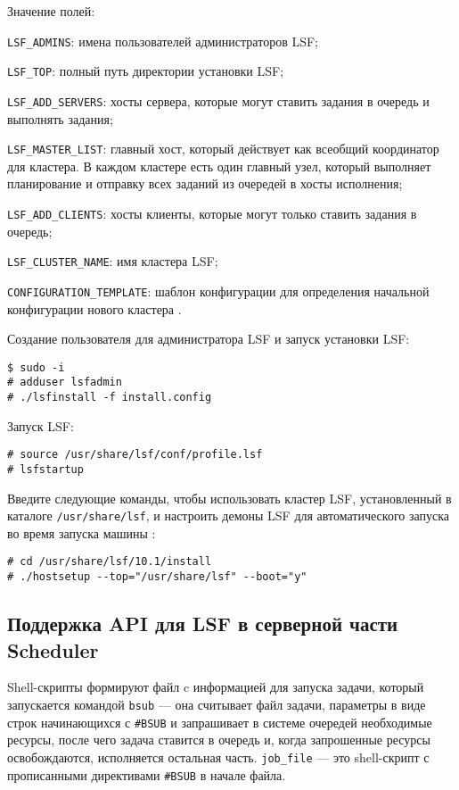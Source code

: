 Значение полей:

\lstinline{LSF_ADMINS}: имена пользователей администраторов LSF;

\lstinline{LSF_TOP}: полный путь директории установки LSF;

\lstinline{LSF_ADD_SERVERS}: хосты сервера, которые могут ставить задания в очередь и выполнять задания;

\lstinline{LSF_MASTER_LIST}: главный хост, который действует как всеобщий координатор для кластера. В каждом кластере есть один главный узел, который выполняет планирование и отправку всех заданий из очередей в хосты исполнения;

\lstinline{LSF_ADD_CLIENTS}: хосты клиенты, которые могут только ставить задания в очередь;

\lstinline{LSF_CLUSTER_NAME}: имя кластера LSF;

\lstinline{CONFIGURATION_TEMPLATE}: шаблон конфигурации для определения начальной конфигурации нового кластера \cite{lsf_overview, hosts_about}.

Создание пользователя для администратора LSF и запуск установки LSF:

\begin{lstlisting}
$ sudo -i
# adduser lsfadmin
# ./lsfinstall -f install.config
\end{lstlisting}

Запуск LSF:

\begin{lstlisting}
# source /usr/share/lsf/conf/profile.lsf
# lsfstartup
\end{lstlisting}

Введите следующие команды, чтобы использовать кластер LSF, установленный в каталоге \lstinline{/usr/share/lsf}, и настроить демоны LSF для автоматического запуска во время запуска машины \cite{configuring-cluster}:

\begin{lstlisting}
# cd /usr/share/lsf/10.1/install
# ./hostsetup --top="/usr/share/lsf" --boot="y"
\end{lstlisting}


\subsection{Поддержка API для LSF в серверной части Scheduler}

Shell-скрипты формируют файл c информацией для запуска задачи, который запускается командой \lstinline{bsub} --- она считывает файл задачи, параметры в виде строк начинающихся с \lstinline{#BSUB} и запрашивает в системе очередей необходимые ресурсы, после чего задача ставится в очередь и, когда запрошенные ресурсы освобождаются, исполняется остальная часть. \lstinline{job_file} --- это shell-скрипт с прописанными директивами \lstinline{#BSUB} в начале файла.

